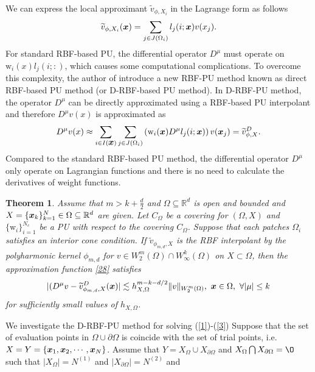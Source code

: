 \documentclass[9pt]{article}
\newtheorem{theorem}{Theorem}[section]
\numberwithin{equation}{section}
\def\bfm#1{\protect{\makebox{\boldmath $#1$}}}
\def\x {\bfm{x}}
\begin{document}
We can express the local approximant $\widetilde{v}_{\phi,X_i}$  in the Lagrange form as follows
\begin{eqnarray}\label{a12}
\widetilde{v}_{\phi,X_i}(\x)=\sum_{j \in J( \Omega_{i})}l_{j}(i;\x)v(x_{j}).
\end{eqnarray}
 For standard RBF-based PU, the differential operator $D^{\mu}$ must operate on  $\mathrm{w}_{i}(x)l_{j}(i;:)$, which causes some computational complications. To overcome this complexity, the author of \cite{refk1} introduce a new RBF-PU method known as direct RBF-based PU method (or D-RBF-based PU method).
 In D-RBF-PU method, the operator $D^{\mu}$ can
be directly approximated using a RBF-based PU interpolant and therefore $D^{\mu}v(x)$ is approximated as
\begin{equation}\label{28}
D^{\mu}v(x)\approx\sum_{i \in I(\x)}\sum_{j \in J(\Omega_{i})} \left(\mathrm{w}_{i}(\x)D^{\mu} l_{j}(i;\x)\right)v(\x_{j})=\widetilde{v}^D_{\phi,X}.
\end{equation}
Compared to the standard RBF-based PU method, the differential operator $D^{\mu}$ only operate on Lagrangian functions and there is no need to calculate the derivatives of weight functions.\\
\begin{theorem}\label{th1}
 Assume that $m>k+\frac{d}{2}$ and $\Omega \subseteq \mathbb{R}^{d}$ is open and bounded and $X=\{\x_{k}\}_{k=1}^{N} \in \Omega \subseteq \mathbb{R}^{d}$ are given. Let $C_{\Omega}$ be a covering for $(\Omega,X)$ and $\{\mathrm{w}_{i}\}_
{i=1}^{N_{c}}$ be a PU with respect to the covering $C_{\Omega}$. Suppose that each patches $\Omega_{i}$ satisfies an interior cone condition. If  $\widetilde{v}_{\phi _{m,d},X}$ is the RBF interpolant
by the polyharmonic kernel $\phi _{m,d}$ for $v\in W_{2}^{m}(\Omega)\cap W_{\infty}^{k}(\Omega)$  on $X\subset \Omega$, then the approximation function \eqref{28} satisfies
\begin{equation*}
 |(D^{\mu}v-\widetilde{v}^D_{\phi _{m,d},X}(\x)| \lesssim h_{X,\Omega}^{m-k-d/2}\Vert v\Vert _{ W_{2}^{m}(\Omega)},~\x\in \Omega,~\forall |\mu|\leq k
 \end{equation*}
for sufficiently small values of $h_{X,\Omega}$.
\end{theorem}
We investigate the  D-RBF-PU  method for solving (\ref{1})-(\ref{3})
Suppose that the set of evaluation points in $\Omega\cup \partial \Omega$ is coincide with the set of trial points, i.e. $X=Y=\{\x_{1},\x_{2},\cdots,\x_{N}\}$. Assume that $Y=X_{\Omega}\cup X_{\partial \Omega}$ and $X_{\Omega}\bigcap X_{\partial \Omega}={\O}$ such that $|X_{\Omega}|=N^{(1)}$ and $|X_{\partial \Omega}|=N^{(2)}$ and
\end{document}
